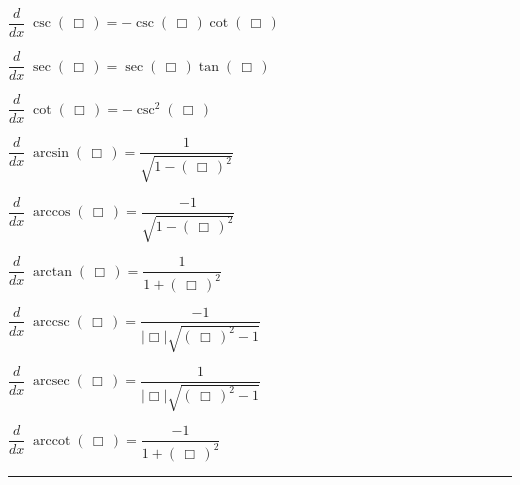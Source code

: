 \documentclass[11pt,letterpaper]{article}
\newenvironment{2enumerate}{%
	\begin{itemize}
	\begin{multicols}{2}
	}{%
	\end{multicols}
	\end{itemize}
}
\DeclareMathOperator{\arccsc}{arccsc}
\DeclareMathOperator{\arcsec}{arcsec}
\DeclareMathOperator{\arccot}{arccot}
\begin{document}
\begin{2enumerate}
\item $\dfrac{d}{dx}\; \csc \left(\, \Box \,\right) = -\csc \left(\, \Box \,\right) \cot \left(\, \Box \,\right)$ \par\vspace{0.05cm}
\item $\dfrac{d}{dx}\; \sec \left(\, \Box \,\right) = \sec \left(\, \Box \,\right) \tan \left(\, \Box \,\right)$ \par\vspace{0.05cm}
\item $\dfrac{d}{dx}\; \cot \left(\, \Box \,\right) =  -\csc^2 \left(\, \Box \,\right)$ \par\vspace{0.05cm}
\item $\dfrac{d}{dx}\; \arcsin \left(\, \Box \,\right) = \dfrac{1}{\sqrt{1 - \left(\, \Box \,\right)^2}}$ \par\vspace{0.05cm}
\item $\dfrac{d}{dx}\; \arccos \left(\, \Box \,\right) = \dfrac{-1}{\sqrt{1 - \left(\, \Box \,\right)^2}}$ \par\vspace{0.05cm}
\item $\dfrac{d}{dx}\; \arctan \left(\, \Box \,\right) = \dfrac{1}{1 + \left(\, \Box \,\right)^2}$ \par\vspace{0.05cm}
\item $\dfrac{d}{dx}\; \arccsc \left(\, \Box \,\right) = \dfrac{-1}{| \Box | \sqrt{\left(\, \Box \,\right)^2 - 1}}$ \par\vspace{0.05cm}
\item $\dfrac{d}{dx}\; \arcsec \left(\, \Box \,\right) = \dfrac{1}{| \Box | \sqrt{\left(\, \Box \,\right)^2 - 1}}$ \par\vspace{0.05cm}
\item $\dfrac{d}{dx}\; \arccot \left(\, \Box \,\right) = \dfrac{-1}{1 + \left(\, \Box \,\right)^2}$ \par\vspace{0.05cm}
\end{2enumerate}

\noindent\rule{\textwidth}{1pt}
\end{document}
